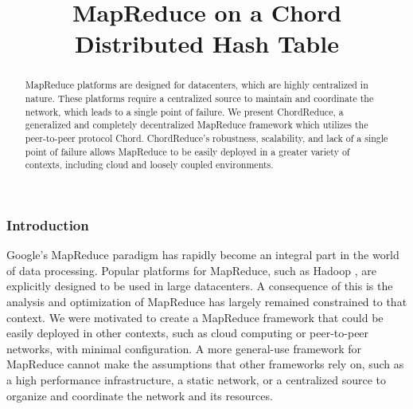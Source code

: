 \documentclass{article}
\title{MapReduce on a Chord Distributed Hash Table}
\date{} %
\begin{document}

\maketitle
\vspace*{-0.65in}
\begin{abstract}

MapReduce platforms are designed for datacenters, which are highly centralized in nature.  These platforms require a centralized source to maintain and coordinate the network, which leads to a single point of failure.  We present ChordReduce, a generalized and completely decentralized MapReduce framework which utilizes the peer-to-peer protocol Chord.  ChordReduce's robustness, scalability, and lack of a single point of failure allows MapReduce to be easily deployed in a greater variety of contexts, including cloud and loosely coupled environments.


\end{abstract}




\subsubsection*{Introduction}

Google's MapReduce \cite{mapreduce} paradigm has rapidly become an integral part in the world of data processing.
Popular platforms for MapReduce, such as Hadoop \cite{Hadoop}, are explicitly designed to be used in large datacenters.  
A consequence of this is the analysis and optimization of MapReduce has largely remained constrained to that context.  
We were motivated to create a MapReduce framework that could be easily deployed in other contexts, such as cloud computing or peer-to-peer networks, with minimal configuration.
A more general-use framework for MapReduce cannot make the assumptions that other frameworks rely on, such as a high performance infrastructure, a static network, or a centralized source to organize and coordinate the network and its resources.  
\end{document}
